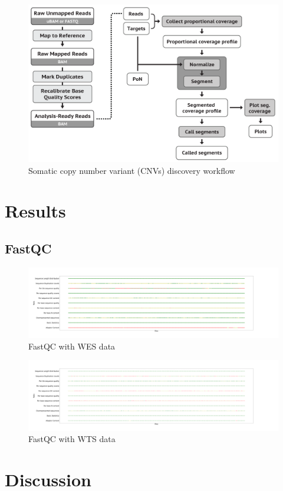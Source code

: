 \documentclass[a4paper]{article}
\begin{document}
            \begin{figure}[p]
                \centering
                \includegraphics[width=0.6 \linewidth]{figures/Workflow/somatic_CNV.png}
                \caption{Somatic copy number variant (CNVs) discovery workflow \protect\cite{gatk1, gatk2}}
            \end{figure}

    \section{Results}
        \subsection{FastQC}

            \begin{figure}[p]
                \centering
                \includegraphics[width=0.8 \linewidth]{figures/FastQC/FastQC_WES.png}
                \caption{FastQC with WES data}
                \label{fig:fastqc-wes}
            \end{figure}

            \begin{figure}[p]
                \centering
                \includegraphics[width=0.8 \linewidth]{figures/FastQC/FastQC_WTS.png}
                \caption{FastQC with WTS data}
                \label{fig:fastqc-wts}
            \end{figure}

    \section{Discussion}

    
    
\end{document}
